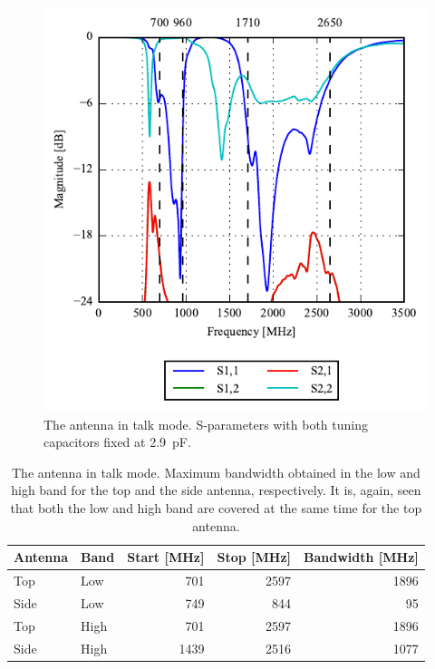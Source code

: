 \begin{figure}[htbp]
    \centering
    \includegraphics{img/tech_sol/nonresonant/simulation/talk_mode/s_params_cMax.pdf}
    \caption{The antenna in talk mode. S-parameters with both tuning capacitors fixed at \SI{2.9}{pF}.}
    \label{fig:ant3_sparam_talk}
\end{figure}

\begin{table}[htbp]
    \centering
    \begin{tabular}{|l|l|r|r|r|}
        \hline
        Antenna & Band & Start [MHz] & Stop [MHz] & Bandwidth [MHz] \\
        \hline
        Top     & Low  & 701         & 2597       & 1896 \\
        Side    & Low  & 749         & 844        & 95   \\
        \hline
        Top     & High & 701         & 2597       & 1896 \\
        Side    & High & 1439        & 2516       & 1077 \\
        \hline
    \end{tabular}
    \caption{The antenna in talk mode. Maximum bandwidth obtained in the low and high band for the top and the side antenna, respectively. It is, again, seen that both the low and high band are covered at the same time for the top antenna.}
    \label{tab:bw_sol3talk}
\end{table}

